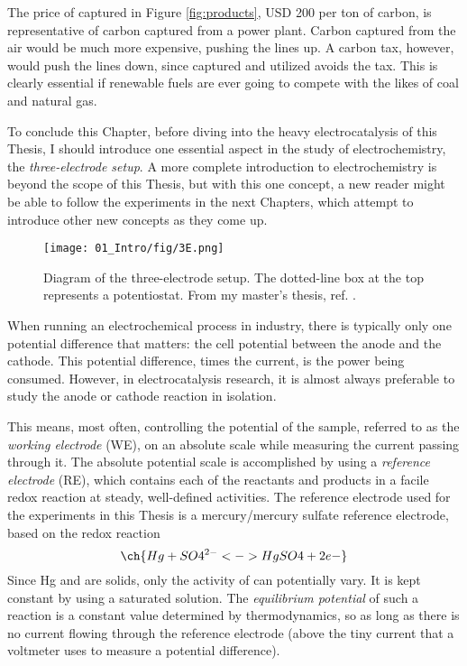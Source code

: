 The price of captured  in Figure \ref{fig:products}, USD 200 per ton of carbon, is representative of carbon captured from a power plant\cite{Majumdar2016}. Carbon captured from the air would be much more expensive, pushing the lines up. A carbon tax, however, would push the lines down, since captured and utilized  avoids the tax. This is clearly essential if renewable fuels are ever going to compete with the likes of coal and natural gas.


\vspace{5mm}
To conclude this Chapter, before diving into the heavy electrocatalysis of this Thesis, I should introduce one essential aspect in the study of electrochemistry, the \textit{three-electrode setup}. A more complete introduction to electrochemistry\cite{Bard2001, Scott2016_MSc} is beyond the scope of this Thesis, but with this one concept, a new reader might be able to follow the experiments in the next Chapters, which attempt to introduce other new concepts as they come up.

\begin{figure}[h!]
	\centering
	\texttt{[image: 01\_Intro/fig/3E.png]}
	\caption{Diagram of the three-electrode setup. The dotted-line box at the top represents a potentiostat. From my master's thesis, ref. .}
	\label{fig:3E}
\end{figure}

When running an electrochemical process in industry, there is typically only one potential difference that matters: the cell potential between the anode and the cathode. This potential difference, times the current, is the power being consumed. However, in electrocatalysis research, it is almost always preferable to study the anode or cathode reaction in isolation. 

This means, most often, controlling the potential of the sample, referred to as the \textit{working electrode} (WE), on an absolute scale while measuring the current passing through it. The absolute potential scale is accomplished by using a \textit{reference electrode} (RE), which contains each of the reactants and products in a facile redox reaction at steady, well-defined activities. The reference electrode used for the experiments in this Thesis is a mercury/mercury sulfate reference electrode, based on the redox reaction
\begin{equation}
\ch{Hg + SO4^{2-} <-> HgSO4 + 2 e-}
\end{equation}
Since Hg and  are solids, only the activity of  can potentially vary. It is kept constant by using a saturated  solution. The \textit{equilibrium potential} of such a reaction is a constant value determined by thermodynamics, so as long as there is no current flowing through the reference electrode (above the tiny current that a voltmeter uses to measure a potential difference).

